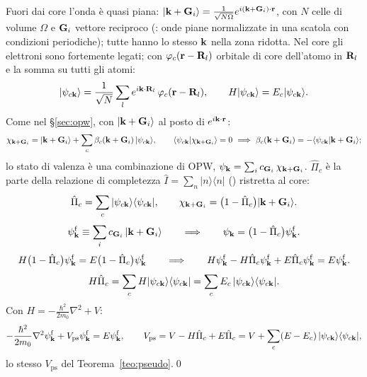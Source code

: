 \documentclass[11pt,a4paper]{article}
\begin{document}
\begin{dimostrazione}
Fuori dai core l'onda è quasi piana: $|\mathbf k+\mathbf G_i\rangle=\frac1{\sqrt{N\Omega}}e^{i(\mathbf k+\mathbf G_i)\cdot\mathbf r}$, con $N$ celle di volume $\Omega$ e $\mathbf G_i$
vettore reciproco (: onde piane normalizzate in una scatola con condizioni periodiche); tutte hanno lo stesso $\mathbf k$ nella zona ridotta.
Nel core gli elettroni sono fortemente legati; con $\varphi_c(\mathbf r-\mathbf R_l)$ orbitale di core dell'atomo in $\mathbf R_l$ e la somma su tutti gli atomi:
\[
|\psi_{c\mathbf k}\rangle=\frac1{\sqrt N}\sum_le^{i\mathbf k\cdot\mathbf R_l}\,\varphi_c(\mathbf r-\mathbf R_l),\qquad H|\psi_{c\mathbf k}\rangle=E_c|\psi_{c\mathbf k}\rangle .
\]
Come nel §\ref{sec:opw}, con $|\mathbf k+\mathbf G_i\rangle$ al posto di $e^{i\mathbf k\cdot\mathbf r}$:
\[
\chi_{\vk+\vG_i}=|\vk+\vG_i\rangle+\sum_c\beta_c(\vk+\vG_i)\,|\psi_{c\vk}\rangle,\qquad
\langle\psi_{c\vk}|\chi_{\vk+\vG_i}\rangle=0\ \Longrightarrow\ \beta_c(\vk+\vG_i)=-\langle\psi_{c\vk}|\vk+\vG_i\rangle ;
\]
lo stato di valenza è una combinazione di OPW, $\psi_{\mathbf k}=\sum_ic_{\mathbf G_i}\,\chi_{\mathbf k+\mathbf G_i}$.
$\hat\Pi_c$ è la parte della relazione di completezza $\hat I=\sum_n|n\rangle\langle n|$ () ristretta al core:
\[
\hat\Pi_c=\sum_c|\psi_{c\mathbf k}\rangle\langle\psi_{c\mathbf k}|,\qquad\chi_{\mathbf k+\mathbf G_i}=\bigl(1-\hat\Pi_c\bigr)|\mathbf k+\mathbf G_i\rangle .
\]
\[
\psi^{\mathrm f}_{\mathbf k}\equiv\sum_ic_{\mathbf G_i}\,|\mathbf k+\mathbf G_i\rangle\qquad\Longrightarrow\qquad\psi_{\mathbf k}=\bigl(1-\hat\Pi_c\bigr)\psi^{\mathrm f}_{\mathbf k}.
\]
\[
H\bigl(1-\hat\Pi_c\bigr)\psi^{\mathrm f}_{\mathbf k}=E\bigl(1-\hat\Pi_c\bigr)\psi^{\mathrm f}_{\mathbf k}\qquad\Longrightarrow\qquad
H\psi^{\mathrm f}_{\mathbf k}-H\hat\Pi_c\psi^{\mathrm f}_{\mathbf k}+E\hat\Pi_c\psi^{\mathrm f}_{\mathbf k}=E\psi^{\mathrm f}_{\mathbf k}.
\]
\[
H\hat\Pi_c=\sum_cH|\psi_{c\mathbf k}\rangle\langle\psi_{c\mathbf k}|=\sum_cE_c\,|\psi_{c\mathbf k}\rangle\langle\psi_{c\mathbf k}| .
\]
Con $H=-\frac{\hbar^2}{2m_0}\nabla^2+V$:
\[
-\frac{\hbar^2}{2m_0}\nabla^2\psi^{\mathrm f}_{\mathbf k}+V_{\mathrm{ps}}\psi^{\mathrm f}_{\mathbf k}=E\psi^{\mathrm f}_{\mathbf k},\qquad
V_{\mathrm{ps}}=V-H\hat\Pi_c+E\hat\Pi_c=V+\sum_c(E-E_c)\,|\psi_{c\mathbf k}\rangle\langle\psi_{c\mathbf k}| ,
\]
lo stesso $V_{\mathrm{ps}}$ del Teorema~\ref{teo:pseudo}.\qed
\end{dimostrazione}
\end{document}
